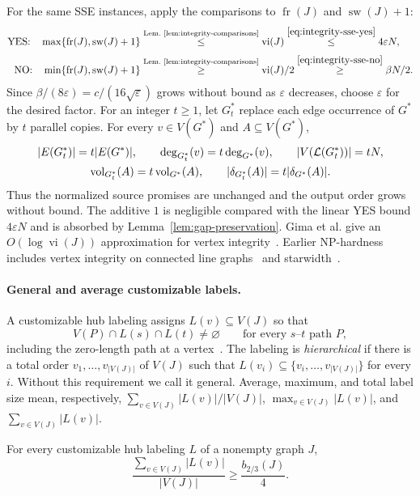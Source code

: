 For the same SSE instances, apply the comparisons to
$\operatorname{fr}(J)$ and $\operatorname{sw}(J)+1$:
\[
\begin{aligned}
 \textup{YES:}\quad
 \max\{\operatorname{fr}(J),\operatorname{sw}(J)+1\}
 &\overset{\text{Lem.~\ref{lem:integrity-comparisons}}}{\leq}\operatorname{vi}(J)
 \overset{\eqref{eq:integrity-sse-yes}}{\leq}4\varepsilon N,\\[2pt]
 \textup{NO:}\quad
 \min\{\operatorname{fr}(J),\operatorname{sw}(J)+1\}
 &\overset{\text{Lem.~\ref{lem:integrity-comparisons}}}{\geq}\operatorname{vi}(J)/2
 \overset{\eqref{eq:integrity-sse-no}}{\geq}\beta N/2.
\end{aligned}
\]
Since $\beta/(8\varepsilon)=c/(16\sqrt\varepsilon)$ grows without
bound as $\varepsilon$ decreases, choose $\varepsilon$ for the desired factor.
For an integer $t\ge1$, let $G_t^*$ replace each edge occurrence of
$G^*$ by $t$ parallel copies. For every $v\in V(G^*)$ and
$A\subseteq V(G^*)$,
\[
\begin{gathered}
 |E(G_t^*)|=t|E(G^*)|,\qquad
 \deg_{G_t^*}(v)=t\deg_{G^*}(v),\qquad
 |V(\mathcal L(G_t^*))|=tN,\\
 \operatorname{vol}_{G_t^*}(A)=t\operatorname{vol}_{G^*}(A),\qquad
 |\delta_{G_t^*}(A)|=t|\delta_{G^*}(A)|.
\end{gathered}
\]
Thus the normalized source promises are unchanged and the output
order grows without bound. The additive $1$ is negligible compared with the
linear YES bound $4\varepsilon N$ and is absorbed by
Lemma~\ref{lem:gap-preservation}.
Gima et al. give an $O(\log\operatorname{vi}(J))$ approximation for vertex
integrity~\cite[Theorem~5.1]{GimaEtAlIntegrity}.
Earlier NP-hardness includes vertex integrity on connected line
graphs~\cite[Corollary 4.11]{GimaEtAlIntegrity} and starwidth~\cite{VanEe2017}.

\paragraph{General and average customizable labels.}
A customizable hub labeling assigns $L(v)\subseteq V(J)$ so that
\[
 V(P)\cap L(s)\cap L(t)\ne\varnothing
 \qquad\text{for every }s\text{--}t\text{ path }P,
\]
including the zero-length path at a vertex~\cite{BlumStorandt2023}.
The labeling is \emph{hierarchical} if there is a total order
$v_1,\ldots,v_{|V(J)|}$ of $V(J)$ such that
$L(v_i)\subseteq\{v_i,\ldots,v_{|V(J)|}\}$ for every $i$.
Without this requirement we call it general. Average,
maximum, and total label size mean, respectively,
$\sum_{v\in V(J)}|L(v)|/|V(J)|$, $\max_{v\in V(J)}|L(v)|$, and
$\sum_{v\in V(J)}|L(v)|$.
\begin{lemma}
\label{lem:customizable-average-separator}
For every customizable hub labeling $L$ of a nonempty graph $J$,
\begin{equation}\label{eq:customizable-average-separator}
 \frac{\sum_{v\in V(J)}|L(v)|}{|V(J)|}
 \geq
 \frac{b_{2/3}(J)}4.
\end{equation}
\end{lemma}

